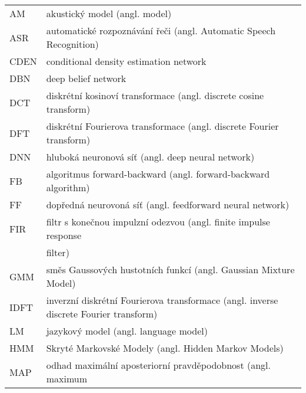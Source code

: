 \hspace{1.3cm}

\begin{longtable}{ll}

AM   & akustický model (angl.  model) \\
ASR  & automatické rozpoznávání řeči (angl. Automatic Speech Recognition) \\
CDEN & conditional density estimation network \\
DBN  & deep belief network \\
DCT  & diskrétní kosinoví transformace (angl. discrete cosine transform) \\
DFT  & diskrétní Fourierova transformace (angl. discrete Fourier transform) \\
DNN  & hluboká neuronová síť (angl. deep neural network) \\
FB   & algoritmus forward-backward (angl. forward-backward algorithm) \\
FF   & dopředná neurovoná síť (angl. feedforward neural network) \\
FIR  & filtr s konečnou impulzní odezvou (angl. finite impulse response \\
     & filter) \\
GMM  & směs Gaussových hustotních funkcí (angl. Gaussian Mixture Model) \\
IDFT  & inverzní diskrétní Fourierova transformace (angl. inverse discrete Fourier transform) \\
LM   & jazykový model (angl. language model) \\
HMM  & Skryté Markovské Modely (angl. Hidden Markov Models) \\
MAP  & odhad maximální aposteriorní pravděpodobnost (angl. maximum \\

\end{longtable}
